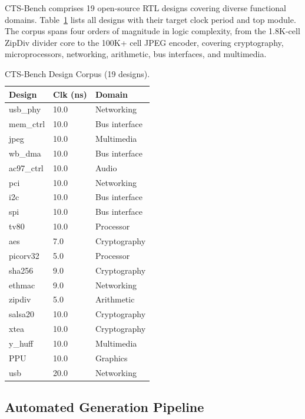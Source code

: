 \documentclass[acmsmall,review,anonymous]{acmart}
\begin{document}
CTS-Bench comprises 19 open-source RTL designs covering diverse functional
domains. Table~\ref{tab:designs} lists all designs with their target clock
period and top module. The corpus spans four orders of magnitude in logic
complexity, from the 1.8K-cell ZipDiv divider core to the 100K+ cell JPEG
encoder, covering cryptography, microprocessors, networking, arithmetic,
bus interfaces, and multimedia.

\begin{table}[htbp]
\centering
\small
\caption{CTS-Bench Design Corpus (19 designs).}
\label{tab:designs}
\begin{tabular}{lll}
\toprule
\textbf{Design} & \textbf{Clk (ns)} & \textbf{Domain} \\
\midrule
usb\_phy    & 10.0 & Networking \\
mem\_ctrl   & 10.0 & Bus interface \\
jpeg        & 10.0 & Multimedia \\
wb\_dma     & 10.0 & Bus interface \\
ac97\_ctrl  & 10.0 & Audio \\
pci         & 10.0 & Networking \\
i2c         & 10.0 & Bus interface \\
spi         & 10.0 & Bus interface \\
tv80        & 10.0 & Processor \\
aes         &  7.0 & Cryptography \\
picorv32    &  5.0 & Processor \\
sha256      &  9.0 & Cryptography \\
ethmac      &  9.0 & Networking \\
zipdiv      &  5.0 & Arithmetic \\
salsa20     & 10.0 & Cryptography \\
xtea        & 10.0 & Cryptography \\
y\_huff     & 10.0 & Multimedia \\
PPU         & 10.0 & Graphics \\
usb         & 20.0 & Networking \\
\bottomrule
\end{tabular}
\end{table}

\subsection{Automated Generation Pipeline}
\end{document}
